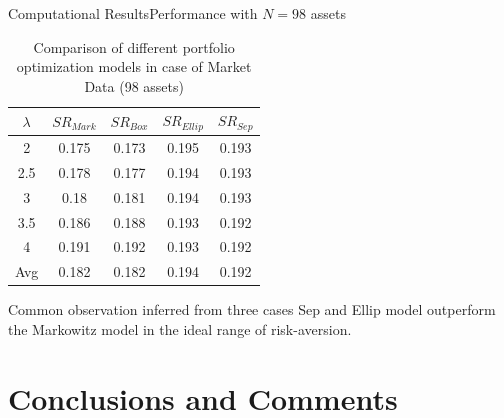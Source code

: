 \documentclass{beamer}
\begin{document}
\begin{frame}{Computational Results}{Performance with $N=98$ assets}

\begin{table}[!h]
    \centering
    \small
    \captionsetup{justification=centering}
   \begin{tabular}{||c|c|c|c|c||}
   \hline
  
  
  $\lambda$ & $SR_{Mark}$ & $SR_{Box}$ & $SR_{Ellip}$ & $SR_{Sep}$ \\
  
  \hline
2 & 0.175 & 0.173 & 0.195 & 0.193 \\
2.5 & 0.178 & 0.177 & 0.194 & 0.193 \\
3 & 0.18 & 0.181 & 0.194 & 0.193 \\
3.5 & 0.186 & 0.188 & 0.193 & 0.192 \\
4 & 0.191 & 0.192 & 0.193 & 0.192 \\
  \hline
  Avg & 0.182 & 0.182 & 0.194 & 0.192 \\
  \hline

\end{tabular}
    \caption{Comparison of different portfolio optimization models in case of Market Data (98 assets)}
    \label{tab:2}
\end{table} 

\begin{block}{Common observation inferred from three cases}
Sep and Ellip model outperform the Markowitz model in the ideal range of risk-aversion.
\end{block}

\end{frame}

\section{Conclusions and Comments}
\end{document}
